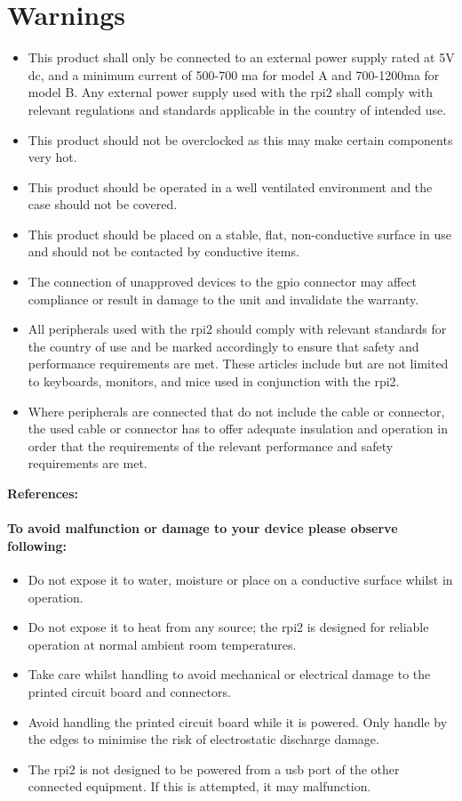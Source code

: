 \section{Warnings}
\begin{itemize}
\item This product shall only be connected to an external power supply rated at 5V dc, and a minimum current of 500-700 \gls{ma} for model A and 700-1200\gls{ma} for model B. Any external power supply used with the \gls{rpi2} shall comply with relevant regulations and standards applicable in the country of intended use. 
\item This product should not be overclocked as this may make certain components very hot. 
\item This product should be operated in a well ventilated environment and the case should not be covered. 
\item This product should be placed on a stable, flat, non-conductive surface in use and should not be contacted by conductive items. 
\item The connection of unapproved devices to the \gls{gpio} connector may affect compliance or result in damage to the unit and invalidate the warranty. 
\item All peripherals used with the \gls{rpi2} should comply with relevant standards for the country of use and be marked accordingly to ensure that safety and performance requirements are met. These articles include but are not limited to keyboards, monitors, and mice used in conjunction with the \gls{rpi2}.
\item Where peripherals are connected that do not include the cable or connector, the used cable or connector has to offer adequate insulation and operation in order that the requirements of the relevant performance and safety requirements are met.
\end{itemize}
\textbf{References: }\cite{Warnings}
\newpage
\paragraph{To avoid malfunction or damage to your device please observe following:}
\begin{itemize}
\item Do not expose it to water, moisture or place on a conductive surface whilst in operation.
\item Do not expose it to heat from any source; the \gls{rpi2} is designed for reliable operation at normal ambient room temperatures.
\item Take care whilst handling to avoid mechanical or electrical damage to the printed circuit board and connectors.
\item Avoid handling the printed circuit board while it is powered. Only handle by the edges to minimise the risk of electrostatic discharge damage.
\item The \gls{rpi2} is not designed to be powered from a \gls{usb} port of the other connected equipment. If this is attempted, it may malfunction.
\end{itemize}
\clearpageauthor


